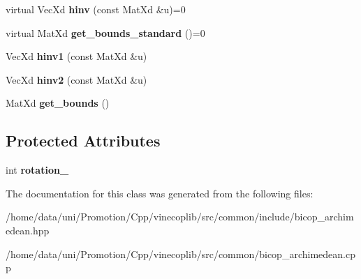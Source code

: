 \begin{DoxyCompactItemize}
\item 
\hypertarget{class_archimedean_bicop_ad9f6cd9ae6ca06f0d2edea2a52f195c9}{virtual Vec\+Xd {\bfseries hinv} (const Mat\+Xd \&u)=0}\label{class_archimedean_bicop_ad9f6cd9ae6ca06f0d2edea2a52f195c9}

\item 
\hypertarget{class_archimedean_bicop_a7f34e0f37adf5d7161c745650270982a}{virtual Mat\+Xd {\bfseries get\+\_\+bounds\+\_\+standard} ()=0}\label{class_archimedean_bicop_a7f34e0f37adf5d7161c745650270982a}

\item 
\hypertarget{class_archimedean_bicop_a2c128be55d4b53898d291c2a5dd53238}{Vec\+Xd {\bfseries hinv1} (const Mat\+Xd \&u)}\label{class_archimedean_bicop_a2c128be55d4b53898d291c2a5dd53238}

\item 
\hypertarget{class_archimedean_bicop_ac053898d7d50daaa284647b57da9d546}{Vec\+Xd {\bfseries hinv2} (const Mat\+Xd \&u)}\label{class_archimedean_bicop_ac053898d7d50daaa284647b57da9d546}

\item 
\hypertarget{class_archimedean_bicop_a69fd33f65829a80aab140c989dd9bad7}{Mat\+Xd {\bfseries get\+\_\+bounds} ()}\label{class_archimedean_bicop_a69fd33f65829a80aab140c989dd9bad7}

\end{DoxyCompactItemize}
\subsection*{Protected Attributes}
\begin{DoxyCompactItemize}
\item 
\hypertarget{class_archimedean_bicop_a85e30abc36b182b37903a4815ef74e4e}{int {\bfseries rotation\+\_\+}}\label{class_archimedean_bicop_a85e30abc36b182b37903a4815ef74e4e}

\end{DoxyCompactItemize}


The documentation for this class was generated from the following files\+:\begin{DoxyCompactItemize}
\item 
/home/data/uni/\+Promotion/\+Cpp/vinecoplib/src/common/include/bicop\+\_\+archimedean.\+hpp\item 
/home/data/uni/\+Promotion/\+Cpp/vinecoplib/src/common/bicop\+\_\+archimedean.\+cpp\end{DoxyCompactItemize}
